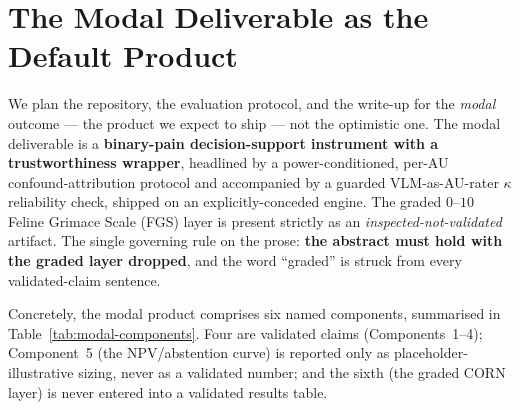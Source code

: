 \section{The Modal Deliverable as the Default Product}
\label{sec:modal-deliverable}

We plan the repository, the evaluation protocol, and the write-up for the
\emph{modal} outcome --- the product we expect to ship --- not the optimistic one.
The modal deliverable is a \textbf{binary-pain decision-support instrument with a
trustworthiness wrapper}, headlined by a power-conditioned, per-AU
confound-attribution protocol and accompanied by a guarded VLM-as-AU-rater $\kappa$
reliability check, shipped on an explicitly-conceded engine. The graded $0$--$10$ Feline Grimace Scale (FGS) layer
is present strictly as an \emph{inspected-not-validated} artifact. The single
governing rule on the prose: \textbf{the abstract must hold with the graded layer
dropped}, and the word ``graded'' is struck from every validated-claim sentence.

Concretely, the modal product comprises six named components, summarised in
Table~\ref{tab:modal-components}. Four are validated claims (Components~1--4);
Component~5 (the NPV/abstention curve) is reported only as placeholder-illustrative
sizing, never as a validated number; and the sixth (the graded CORN layer) is never
entered into a validated results table.

